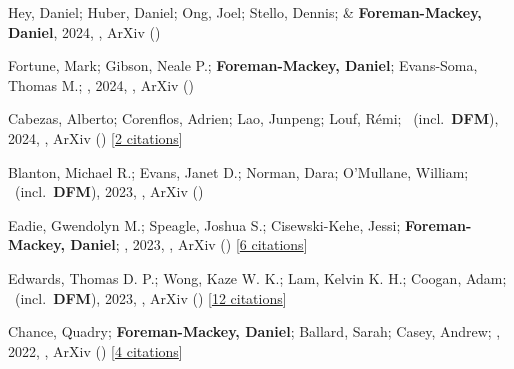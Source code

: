 \item[{\color{numcolor}\scriptsize12}] Hey, Daniel; Huber, Daniel; Ong, Joel; Stello, Dennis; \& \textbf{Foreman-Mackey, Daniel}, 2024, , ArXiv ()

\item[{\color{numcolor}\scriptsize11}] Fortune, Mark; Gibson, Neale P.; \textbf{Foreman-Mackey, Daniel}; Evans-Soma, Thomas M.; \etal, 2024, , ArXiv ()

\item[{\color{numcolor}\scriptsize10}] Cabezas, Alberto; Corenflos, Adrien; Lao, Junpeng; Louf, R{\'e}mi; \etal\ (incl.\ \textbf{DFM}), 2024, , ArXiv () [\href{https://ui.adsabs.harvard.edu/abs/2024arXiv240210797C}{2 citations}]

\item[{\color{numcolor}\scriptsize9}] Blanton, Michael R.; Evans, Janet D.; Norman, Dara; O'Mullane, William; \etal\ (incl.\ \textbf{DFM}), 2023, , ArXiv ()

\item[{\color{numcolor}\scriptsize8}] Eadie, Gwendolyn M.; Speagle, Joshua S.; Cisewski-Kehe, Jessi; \textbf{Foreman-Mackey, Daniel}; \etal, 2023, , ArXiv () [\href{https://ui.adsabs.harvard.edu/abs/2023arXiv230204703E}{6 citations}]

\item[{\color{numcolor}\scriptsize7}] Edwards, Thomas D. P.; Wong, Kaze W. K.; Lam, Kelvin K. H.; Coogan, Adam; \etal\ (incl.\ \textbf{DFM}), 2023, , ArXiv () [\href{https://ui.adsabs.harvard.edu/abs/2023arXiv230205329E}{12 citations}]

\item[{\color{numcolor}\scriptsize6}] Chance, Quadry; \textbf{Foreman-Mackey, Daniel}; Ballard, Sarah; Casey, Andrew; \etal, 2022, , ArXiv () [\href{https://ui.adsabs.harvard.edu/abs/2022arXiv220611275C}{4 citations}]

